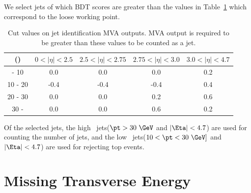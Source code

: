 We select jets of which BDT scores are greater than the values 
in Table~\ref{tab:jetidcut} which correspond to the loose working point. 
\begin{table}[htp]
\small
	\centering
		\begin{tabular}{c|c|c|c|c}
			\hline
			\pt(\GeV)	&  $0<|\eta|<2.5$ 	& $2.5<|\eta|<2.75$		& $2.75<|\eta|<3.0$ 	& $3.0<|\eta|<4.7$ 		\\ 
			\hline \hline
				 - 10 		& 0.0 				& 0.0					& 0.0	 				& 0.2					\\ 
				10 - 20 	& -0.4 				& -0.4					& -0.4	 				& 0.4					\\
				20 - 30	& 0.0 				& 0.0					& 0.2	 				& 0.6					\\ 
				30 - 		& 0.0 				& 0.0					& 0.6	 				& 0.2					\\
			\hline 
		\end{tabular}
		\caption{Cut values on jet identification MVA outputs. MVA output is required to be greater than 
				these values to be counted as a jet.}
	\label{tab:jetidcut}
\end{table}
Of the selected jets, the high \pt\ jets($\pt>30~\GeV$ and $|\Eta|<4.7$) are used for counting 
the number of jets, and the low \pt\ jets($10<\pt<30~\GeV]$ and $|\Eta|<4.7$) are used 
for rejecting top events. 


\section{ Missing Transverse Energy }

